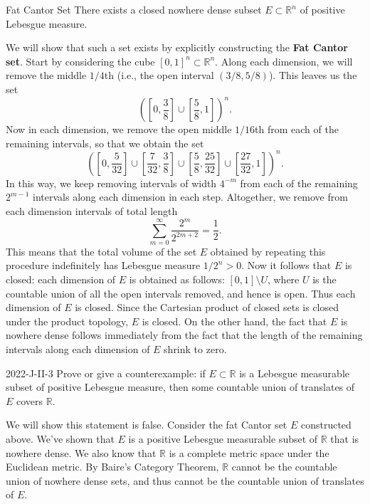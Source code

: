 \documentclass{article}
\begin{document}
	\begin{prb}{Fat Cantor Set}
		There exists a closed nowhere dense subset $E \subset \mathbb{R}^n$ of positive Lebesgue measure. 
	\end{prb}
	We will show that such a set exists by explicitly constructing the \textbf{Fat Cantor set}. Start by considering the cube $[0,1]^{n} \subset \mathbb{R}^n$. Along each dimension, we will remove the middle $1/4$th (i.e., the open interval $(3/8,5/8)$). This leaves us the set 
	\begin{equation*}
		\left(\left[0, \frac{3}{8}\right] \cup \left[\frac{5}{8}, 1\right]\right)^{n}. 
	\end{equation*}
	Now in each dimension, we remove the open middle $1/16$th from each of the remaining intervals, so that we obtain the set 
	\begin{equation*}
		\left(\left[0, \frac{5}{32}\right] \cup \left[\frac{7}{32}, \frac{3}{8}\right] \cup \left[\frac{5}{8}, \frac{25}{32}\right] \cup \left[\frac{27}{32}, 1\right]\right)^{n}. 
	\end{equation*}
	In this way, we keep removing intervals of width $4^{-m}$ from each of the remaining $2^{m-1}$ intervals along each dimension in each step. Altogether, we remove from each dimension intervals of total length
	\begin{equation*}
		\sum_{m = 0}^{\infty}\frac{2^{m}}{2^{2m + 2}} = \frac{1}{2}. 
	\end{equation*}
	This means that the total volume of the set $E$ obtained by repeating this procedure indefinitely has Lebesgue measure $1/2^n > 0$. Now it follows that $E$ is closed: each dimension of $E$ is obtained as follows: $[0,1]\setminus U$, where $U$ is the countable union of all the open intervals removed, and hence is open. Thus each dimension of $E$ is closed. Since the Cartesian product of closed sets is closed under the product topology, $E$ is closed. On the other hand, the fact that $E$ is nowhere dense follows immediately from the fact that the length of the remaining intervals along each dimension of $E$ shrink to zero. 
	
	\begin{prb}{2022-J-II-3}
		Prove or give a counterexample: if $E \subset \mathbb{R}$ is a Lebesgue measurable subset of positive Lebesgue measure, then some countable union of translates of $E$ covers $\mathbb{R}$. 
	\end{prb}
	We will show this statement is false. Consider the fat Cantor set $E$ constructed above. We've shown that $E$ is a positive Lebesgue measurable subset of $\mathbb{R}$ that is nowhere dense. We also know that $\mathbb{R}$ is a complete metric space under the Euclidean metric. By Baire's Category Theorem, $\mathbb{R}$ cannot be the countable union of nowhere dense sets, and thus cannot be the countable union of translates of $E$. 
	
\end{document}
